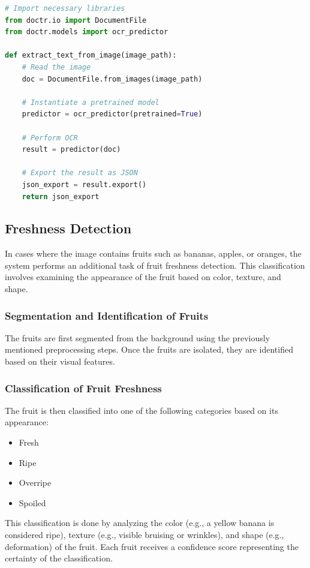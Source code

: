 \documentclass[12pt]{report}
\begin{document}
\begin{lstlisting}[language=Python, caption={OCR Code Using Doctr}]
# Import necessary libraries
from doctr.io import DocumentFile
from doctr.models import ocr_predictor

def extract_text_from_image(image_path):
    # Read the image
    doc = DocumentFile.from_images(image_path)
    
    # Instantiate a pretrained model
    predictor = ocr_predictor(pretrained=True)
    
    # Perform OCR
    result = predictor(doc)
    
    # Export the result as JSON
    json_export = result.export()
    return json_export
\end{lstlisting}

\subsection{Freshness Detection}
In cases where the image contains fruits such as bananas, apples, or oranges, the system performs an additional task of fruit freshness detection. This classification involves examining the appearance of the fruit based on color, texture, and shape.

\subsubsection{Segmentation and Identification of Fruits}
The fruits are first segmented from the background using the previously mentioned preprocessing steps. Once the fruits are isolated, they are identified based on their visual features.

\subsubsection{Classification of Fruit Freshness}
The fruit is then classified into one of the following categories based on its appearance:
\begin{itemize}
    \item Fresh
    \item Ripe
    \item Overripe
    \item Spoiled
\end{itemize}

This classification is done by analyzing the color (e.g., a yellow banana is considered ripe), texture (e.g., visible bruising or wrinkles), and shape (e.g., deformation) of the fruit. Each fruit receives a confidence score representing the certainty of the classification.
\end{document}

